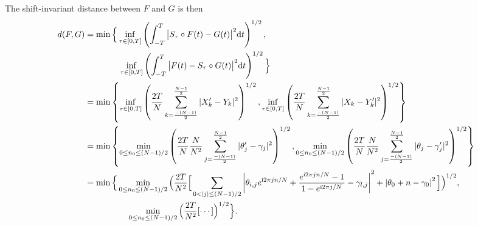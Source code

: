 The shift-invariant distance between $F$ and $G$ is then 
\begin{align*}
	 d(F, G) 
	 &= \min\Big\{ \inf_{\tau\in[0,T]} 
	 \left( \int_{-T}^T\big| S_\tau\circ F(t)-G(t) \big|^2 \text{d}t \right)^{1/2}, \\
	 & \qquad \quad \quad \inf_{\tau\in[0,T]}\left( \int_{-T}^T
	 \big| F(t)-S_\tau\circ G(t) \big|^2 \text{d}t \right)^{1/2} \Big\} \\
	 &= \min\left\{ \inf_{\tau\in[0,T]} 
	 \left( 
	 	\frac{2T}{N} \sum_{k=\frac{-(N-1)}{2}}^{\frac{N-1}{2}} |X_k'-Y_k|^2
	 \right)^{1/2}, 
	  \inf_{\tau\in[0,T]}\left( 
	  \frac{2T}{N} \sum_{k=\frac{-(N-1)}{2}}^{\frac{N-1}{2}} |X_k-Y_k'|^2
	 \right)^{1/2} \right\} \\
	 &= \min \left\{ 
	 	\min_{0\leq n_0\leq (N-1)/2} 
	 	\left(\frac{2T}{N}\frac{N}{N^2} 
	 		 	\sum_{j=\frac{-(N-1)}{2}}^{\frac{N-1}{2}}
	 		 	|\theta_j' - \gamma_j|^2 \right)^{1/2} ,
	 	\min_{0\leq n_0\leq (N-1)/2} 
	 	\left(\frac{2T}{N}\frac{N}{N^2} 
	 		 	\sum_{j=\frac{-(N-1)}{2}}^{\frac{N-1}{2}}
	 		 	|\theta_j - \gamma_j'|^2 \right)^{1/2}
	  \right\} \\
	  &= \min \Big\{ 
	 	\min_{0\leq n_0\leq (N-1)/2} 
	 	\Big(\frac{2T}{N^2}
	 		\Big[\sum_{0<|j|\leq (N-1)/2}
				\left| \theta_{i,j}e^{\complexunit 2\pi j n/N}+
				\frac{e^{\complexunit{}2\pi j n/N}-1}{1-e^{\complexunit{}2\pi j /N}}
				-\gamma_{l,j} \right|^2
				+ \left| \theta_0+n-\gamma_0 \right|^2 \Big]
	 	\Big)^{1/2}, \\
	 	& \quad \quad \quad \quad \quad 
	 	\min_{0\leq n_0\leq (N-1)/2} 
	 	\Big(\frac{2T}{N^2}
	 		[\cdots] 
	 	\Big)^{1/2}
	  \Big\}.
\end{align*}

